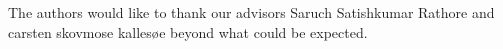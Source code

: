 The authors would like to thank our advisors Saruch Satishkumar Rathore and carsten skovmose kallesøe beyond what could be expected. 